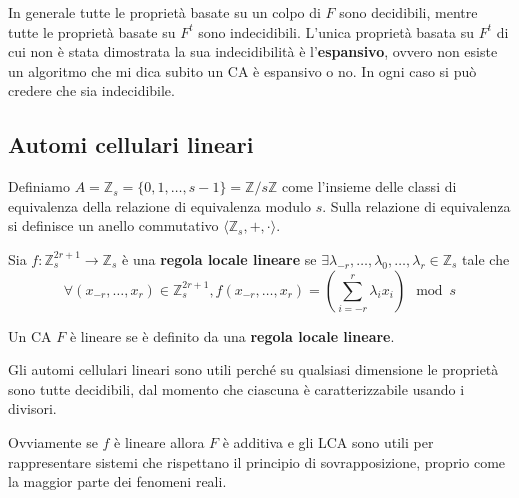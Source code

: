 In generale tutte le proprietà basate su un colpo di $F$ sono decidibili, mentre 
tutte le proprietà basate su $F^t$ sono indecidibili. L'unica proprietà basata 
su $F^t$ di cui non è stata dimostrata la sua indecidibilità è l'\textbf{espansivo},
ovvero non esiste un algoritmo che mi dica subito un CA è espansivo o no. In ogni 
caso si può credere che sia indecidibile.

\subsection{Automi cellulari lineari}
Definiamo $A= \mathbb{Z}_s = \{0,1,\dots, s-1\} =\mathbb{Z}/s\mathbb{Z}$ come 
l'insieme delle classi di equivalenza della relazione di equivalenza modulo $s$.
Sulla relazione di equivalenza si definisce un anello commutativo $\langle \mathbb{Z}_s,
+, \cdot \rangle$.

\begin{definizione} 
    Sia $f:\mathbb{Z}_s^{2r+1}\rightarrow \mathbb{Z}_s$ è una \textbf{regola locale lineare} se  $\exists \lambda_{-r},
    \dots,\lambda_0,\dots,\lambda_r\in \mathbb{Z}_s$ tale che 
    \begin{equation*}
    \forall (x_{-r},\dots, x_r)\in \mathbb{Z}_s^{2r+1}, f(x_{-r},\dots, x_r) = \left(\sum_{i=-r}^{r}\lambda_ix_i\right)\mod s
    \end{equation*}
\end{definizione}

\begin{definizione} 
    Un CA $F$ è lineare se è definito da una \textbf{regola locale lineare}.
\end{definizione}

Gli automi cellulari lineari sono utili perché su qualsiasi dimensione le proprietà
sono tutte decidibili, dal momento che ciascuna è caratterizzabile usando i divisori.

Ovviamente se $f$ è lineare allora $F$ è additiva e gli LCA sono utili per rappresentare 
sistemi che rispettano il principio di sovrapposizione, proprio come la maggior parte 
dei fenomeni reali.

